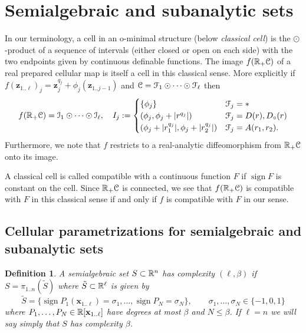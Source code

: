 \documentclass[reqno]{amsart}
\newtheorem{Def}[Cor]{Definition}{\bfseries}{\rmfamily}
\renewcommand\~[1]{\widetilde{#1}}
\def\sign{\operatorname{sign}}
\def\cF{{\mathcal F}} \def\cL{{\mathcal L}} \def\cR{{\mathcal R}}
\def\cI{{\mathcal I}} \def\cJ{{\mathcal J}} \def\cK{{\mathcal K}}
\def\vx{{\mathbf x}}
\def\vz{{\mathbf z}}
\begin{document}
\section{Semialgebraic and subanalytic sets}

In our terminology, a cell in an o-minimal structure (below
\emph{classical cell}) is the $\odot$-product of a sequence of
intervals (either closed or open on each side) with the two endpoints
given by continuous definable functions. The image $f({\mathbb R}_+{\mathcal C})$ of a
real prepared cellular map is itself a cell in this classical
sense. More explicitly if
$f(\vz_{1..\ell})_j=\vz_j^{q_j}+\phi_j(\vz_{1..j-1})$ and
$\cC=\cF_1\odot\cdots\odot\cF_\ell$ then
\begin{equation}
  f(\R_+\cC) = \cI_1\odot\cdots\odot\cI_\ell, \quad I_j :=
  \begin{cases}
    \{\phi_j\} & \cF_j = * \\
    (\phi_j,\phi_j+|r^{q_j}|) & \cF_j = D(r),D_\circ(r) \\
    (\phi_j+|r_1^{q_j}|,\phi_j+|r_2^{q_j}|) & \cF_j = A(r_1,r_2).
  \end{cases}
\end{equation}
Furthermore, we note that $f$ restricts to a real-analytic
diffeomorphism from ${\mathbb R}_+{\mathcal C}$ onto its image.

A classical cell is called compatible with a continuous function $F$
if $\sign F$ is constant on the cell. Since ${\mathbb R}_+{\mathcal C}$ is connected, we
see that $f({\mathbb R}_+{\mathcal C})$ is compatible with $F$ in this classical sense
if and only if $f$ is compatible with $F$ in our sense.

\subsection{Cellular parametrizations for semialgebraic and
  subanalytic sets}

\begin{Def}\label{def:semialg-complexity}
  A semialgebraic set $S\subset{\mathbb R}^n$ has \emph{complexity} $(\ell,\beta)$
  if $S=\pi_{1..n}(\tilde S)$ where $\tilde S\subset{\mathbb R}^\ell$ is given
  by
  \begin{equation}
    \tilde S = \{ \sign P_1(\vx_{1..\ell})=\sigma_1,\ldots,\sign P_N=\sigma_N \}, \qquad \sigma_1,\ldots,\sigma_N\in\{-1,0,1\}
  \end{equation}
  where $P_1,\ldots,P_N\in\R[\vx_{1..\ell}]$ have degrees at most
  $\beta$ and $N\le\beta$. If $\ell=n$ we will say simply that $S$ has
  complexity $\beta$.
\end{Def}
\end{document}

